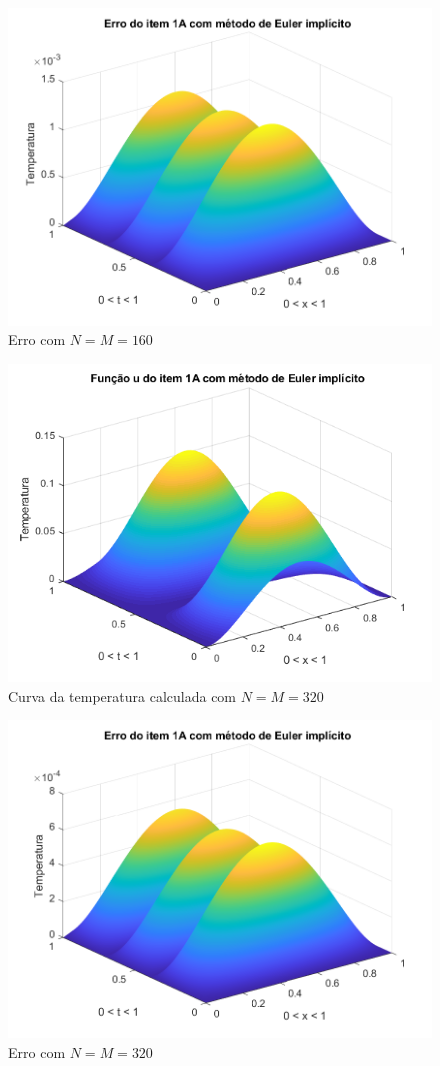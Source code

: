 \documentclass[12pt]{article}
\begin{document}
\begin{spacing}{1.5}
\begin{figure}
    \centering
    \includegraphics[width=0.8\linewidth]{Segunda_Tarefa/ItemB/nm160_erro_A.png}
    \caption{Erro com $N=M=160$}
    \label{fig:BA_nm160_erro}
\end{figure}

\begin{figure}
    \centering
    \includegraphics[width=0.8\linewidth]{Segunda_Tarefa/ItemB/nm320_calculada_A.png}
    \caption{Curva da temperatura calculada com $N=M=320$}
    \label{fig:BA_nm320_calculada}
\end{figure}

\begin{figure}
    \centering
    \includegraphics[width=0.8\linewidth]{Segunda_Tarefa/ItemB/nm320_erro_A.png}
    \caption{Erro com $N=M=320$}
    \label{fig:BA_nm320_erro}
\end{figure}


\end{spacing}
\end{document}
